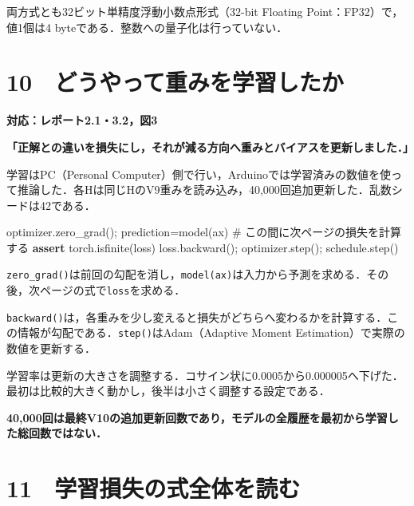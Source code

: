 \documentclass[
  14pt,
  a5paper,
]{extarticle}
\newenvironment{Shaded}{}{}
\newcommand{\CommentTok}[1]{\textcolor[rgb]{0.38,0.63,0.69}{\textit{#1}}}
\newcommand{\ControlFlowTok}[1]{\textcolor[rgb]{0.00,0.44,0.13}{\textbf{#1}}}
\newcommand{\NormalTok}[1]{#1}
\newcommand{\OperatorTok}[1]{\textcolor[rgb]{0.40,0.40,0.40}{#1}}
\renewcommand{\CommentTok}[1]{\textcolor[rgb]{0.25,0.25,0.25}{#1}}
\begin{document}
両方式とも32ビット単精度浮動小数点形式（32-bit Floating
Point：FP32）で，値1個は4 byteである．整数への量子化は行っていない．

\newpage

\section{10　どうやって重みを学習したか}\label{ux3069ux3046ux3084ux3063ux3066ux91cdux307fux3092ux5b66ux7fd2ux3057ux305fux304b}

\textbf{対応：レポート2.1・3.2，図3}

\textbf{「正解との違いを損失にし，それが減る方向へ重みとバイアスを更新しました．」}

学習はPC（Personal
Computer）側で行い，Arduinoでは学習済みの数値を使って推論した．各Hは同じHのV9重みを読み込み，40,000回追加更新した．乱数シードは42である．

\begin{Shaded}
\begin{Highlighting}[]
\NormalTok{optimizer.zero\_grad()}\OperatorTok{;}\NormalTok{ prediction}\OperatorTok{=}\NormalTok{model(ax)}
\CommentTok{\# この間に次ページの損失を計算する}
\ControlFlowTok{assert}\NormalTok{ torch.isfinite(loss)}
\NormalTok{loss.backward()}\OperatorTok{;}\NormalTok{ optimizer.step()}\OperatorTok{;}\NormalTok{ schedule.step()}
\end{Highlighting}
\end{Shaded}

\texttt{zero\_grad()}は前回の勾配を消し，\texttt{model(ax)}は入力から予測を求める．その後，次ページの式で\texttt{loss}を求める．

\texttt{backward()}は，各重みを少し変えると損失がどちらへ変わるかを計算する．この情報が勾配である．\texttt{step()}はAdam（Adaptive
Moment Estimation）で実際の数値を更新する．

学習率は更新の大きさを調整する．コサイン状に0.0005から0.000005へ下げた．最初は比較的大きく動かし，後半は小さく調整する設定である．

\textbf{40,000回は最終V10の追加更新回数であり，モデルの全履歴を最初から学習した総回数ではない．}

\newpage

\section{11　学習損失の式全体を読む}\label{ux5b66ux7fd2ux640dux5931ux306eux5f0fux5168ux4f53ux3092ux8aadux3080}
\end{document}
